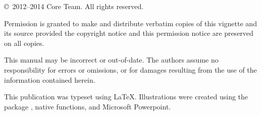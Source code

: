 \null
\vfill

\copyright\ 2012--2014 \pbdR Core Team.  All rights reserved.

Permission is granted to make and distribute verbatim copies of this vignette
and its source provided the copyright notice and this permission notice are
preserved on all copies.

This manual may be incorrect or out-of-date.  The authors assume
no responsibility for errors or omissions, or for damages resulting
from the use of the information contained herein.

This publication was typeset using \LaTeX. Illustrations were created
using the  package \citep{ggplot2}, native  functions,
and Microsoft Powerpoint.
